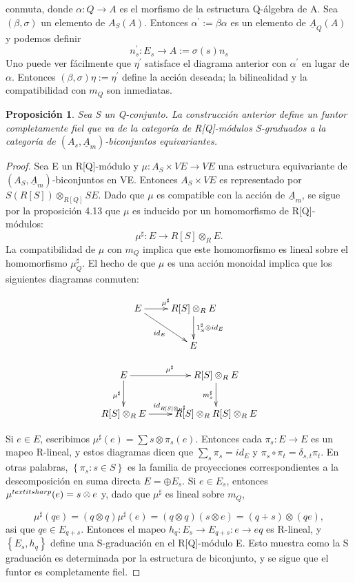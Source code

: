 \documentclass[12pt,spanish]{amsart}
\newcommand{\set}[1]{\left\{{#1}\right\}}
\newtheorem{prop}[Theorem]{Proposición}
\theoremstyle{definition}
\theoremstyle{remark}
\begin{document}
conmuta, donde $\alpha:Q \to A$ es el morfismo de la estructura Q-álgebra de A. Sea $(\beta, \sigma)$ un elemento de $A_{S}(A)$. Entonces $\alpha^{\prime}:=\beta \alpha$ es un elemento de $\underline{A}_{Q}(A)$ y podemos definir 
$$n_{s}^{\prime}:E_{s} \to A:= \sigma(s)n_{s}$$
Uno puede ver fácilmente que $\eta^{\prime}$ satisface el diagrama anterior con $\alpha^{\prime}$ en lugar de $\alpha$. Entonces $(\beta,\sigma)\eta:= \eta^{\prime}$ define la acción deseada; la bilinealidad y la compatibilidad con $m_{Q}$ son inmediatas. 


\begin{prop}
 Sea S un Q-conjunto. La construcción anterior define un funtor completamente fiel que va de la categoría de R[Q]-módulos S-graduados a la categoría de $(A_{s},\underline{A}_{m})$-biconjuntos equivariantes. 
\end{prop}

\begin{proof}
Sea E un R[Q]-módulo y $\mu:A_{S}\times VE \to VE$ una estructura equivariante de $(A_{S},\underline{A}_{m})$-biconjuntos en VE. Entonces $A_{S}\times VE$ es representado por $S(R[S])\otimes_{R[Q]} SE$. Dado que $\mu$ es compatible con la acción de $\underline{A}_{m}$, se sigue por la proposición 4.13 que $\mu$ es inducido por un homomorfismo de R[Q]-módulos:
$$\mu^{\sharp}:E \to R[S]\otimes_{R} E.$$
La compatibilidad de $\mu$ con $m_{Q}$ implica que este homomorfismo es lineal sobre el homomorfismo $\mu^{\sharp}_{Q}$. El hecho de que $\mu$ es una acción monoidal implica que los siguientes diagramas conmuten:

$$\xymatrix{
E \ar[dr]_{id_{E}} \ar[r]^{\mu^{\sharp}} & R[S] \otimes_{R} E \ar[d]^{1_{S}^{\sharp}\otimes id_{E}} \\
& E
}
$$

$$\xymatrix{
E \ar[d]_{\mu^{\sharp}} \ar[r]^{\mu^{\sharp}} & R[S]\otimes_{R} E \ar[d]_{m_{s}^{\sharp}} \\
R[S]\otimes_{R} E \ar[r]^{id_{R[S] \otimes \mu^{\sharp}}} & R[S]\otimes_{R} R[S] \otimes_{R} E  
}
$$

Si $e\in E$, escribimos $\mu^{\sharp}(e)=\sum s\otimes \pi_{s}(e)$. Entonces cada $\pi_{s}:E \to E$ es un mapeo R-lineal, y estos diagramas dicen que $\sum_{s} \pi_{s}=id_{E}$ y $\pi_{s}\circ \pi_{t}=\delta_{s,t}\pi_{t}$. En otras palabras, $\set{\pi_{s}:s\in S}$ es la familia de proyecciones correspondientes a la descomposición en suma directa $E=\oplus E_{s}$. Si $e\in E_{s}$, entonces $\mu^{\\textit{sharp}}(e)=s\otimes e$ y, dado que $\mu^{\sharp}$ es lineal sobre $m_{Q}$, 

$$ \mu^{\sharp}(qe)=(q\otimes q)\mu^{\sharp}(e)=(q\otimes q)(s\otimes e) = (q+s)\otimes (qe),$$
asi que $qe\in E_{q+s}$. Entonces el mapeo $h_{q}:E_{s} \to E_{q+s}:e \to eq$ es R-lineal, y $\set{E_{s},h_{q}}$ define una S-graduación en el R[Q]-módulo E. Esto muestra como la S graduación es determinada por la estructura de biconjunto, y se sigue que el funtor es completamente fiel.  
\end{proof}
\end{document}

